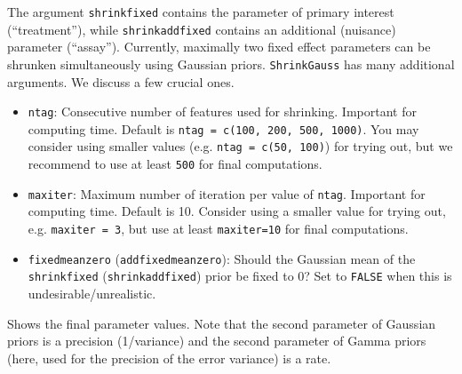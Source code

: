 \documentclass[11pt]{article}
\newcommand{\para}{\bigskip\noindent}
\begin{document}
The argument {\tt shrinkfixed} contains the parameter of primary interest (``treatment''), while {\tt shrinkaddfixed}
contains an additional (nuisance) parameter (``assay''). Currently, maximally two fixed effect parameters can be shrunken
simultaneously using Gaussian priors.
{\tt ShrinkGauss} has many additional arguments.
We discuss a few crucial ones.
\begin{itemize}
\item {\tt ntag}: Consecutive number of features used for shrinking. Important for computing time.
Default is {\tt ntag = c(100, 200, 500, 1000)}. You may
consider using smaller values (e.g. {\tt ntag = c(50, 100)}) for trying out, but we recommend to use at least {\tt 500} for final
computations.
\item {\tt maxiter}: Maximum number of iteration per value of {\tt ntag}. Important for computing time.
Default is 10. Consider using a smaller value for trying out, e.g. {\tt maxiter = 3}, but use at least {\tt maxiter=10} for final
computations.
\item {\tt fixedmeanzero} ({\tt addfixedmeanzero}): Should the Gaussian mean of the {\tt shrinkfixed} ({\tt shrinkaddfixed}) prior
    be fixed to 0?
Set to {\tt FALSE} when this is undesirable/unrealistic.
\end{itemize}


\para
\begin{Schunk}
\end{Schunk}
Shows the final parameter values. Note that the second parameter of Gaussian priors is a precision (1/variance)
and the second parameter of Gamma priors (here, used for the precision of the error variance) is a rate.
\end{document}

